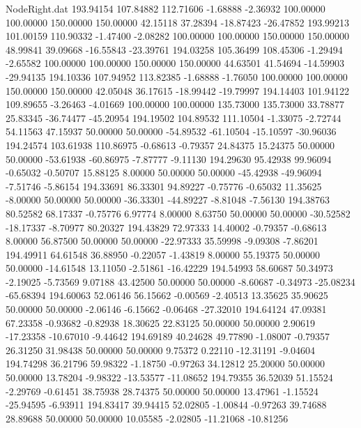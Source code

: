 \begin{filecontents}{NodeRight.dat}
 193.94154  107.84882  112.71606    -1.68888   -2.36932  100.00000  100.00000  150.00000  150.00000   42.15118   37.28394  -18.87423  -26.47852
 193.99213  101.00159  110.90332    -1.47400   -2.08282  100.00000  100.00000  150.00000  150.00000   48.99841   39.09668  -16.55843  -23.39761
 194.03258  105.36499  108.45306    -1.29494   -2.65582  100.00000  100.00000  150.00000  150.00000   44.63501   41.54694  -14.59903  -29.94135
 194.10336  107.94952  113.82385    -1.68888   -1.76050  100.00000  100.00000  150.00000  150.00000   42.05048   36.17615  -18.99442  -19.79997
 194.14403  101.94122  109.89655    -3.26463   -4.01669  100.00000  100.00000  135.73000  135.73000   33.78877   25.83345  -36.74477  -45.20954
 194.19502  104.89532  111.10504    -1.33075   -2.72744   54.11563   47.15937   50.00000   50.00000  -54.89532  -61.10504  -15.10597  -30.96036
 194.24574  103.61938  110.86975    -0.68613   -0.79357   24.84375   15.24375   50.00000   50.00000  -53.61938  -60.86975   -7.87777   -9.11130
 194.29630   95.42938   99.96094    -0.65032   -0.50707   15.88125    8.00000   50.00000   50.00000  -45.42938  -49.96094   -7.51746   -5.86154
 194.33691   86.33301   94.89227    -0.75776   -0.65032   11.35625   -8.00000   50.00000   50.00000  -36.33301  -44.89227   -8.81048   -7.56130
 194.38763   80.52582   68.17337    -0.75776    6.97774    8.00000    8.63750   50.00000   50.00000  -30.52582  -18.17337   -8.70977   80.20327
 194.43829   72.97333   14.40002    -0.79357   -0.68613    8.00000   56.87500   50.00000   50.00000  -22.97333   35.59998   -9.09308   -7.86201
 194.49911   64.61548   36.88950    -0.22057   -1.43819    8.00000   55.19375   50.00000   50.00000  -14.61548   13.11050   -2.51861  -16.42229
 194.54993   58.60687   50.34973    -2.19025   -5.73569    9.07188   43.42500   50.00000   50.00000   -8.60687   -0.34973  -25.08234  -65.68394
 194.60063   52.06146   56.15662    -0.00569   -2.40513   13.35625   35.90625   50.00000   50.00000   -2.06146   -6.15662   -0.06468  -27.32010
 194.64124   47.09381   67.23358    -0.93682   -0.82938   18.30625   22.83125   50.00000   50.00000    2.90619  -17.23358  -10.67010   -9.44642
 194.69189   40.24628   49.77890    -1.08007   -0.79357   26.31250   31.98438   50.00000   50.00000    9.75372    0.22110  -12.31191   -9.04604
 194.74298   36.21796   59.98322    -1.18750   -0.97263   34.12812   25.20000   50.00000   50.00000   13.78204   -9.98322  -13.53577  -11.08652
 194.79355   36.52039   51.15524    -2.29769   -0.61451   38.75938   28.74375   50.00000   50.00000   13.47961   -1.15524  -25.94595   -6.93911
 194.83417   39.94415   52.02805    -1.00844   -0.97263   39.74688   28.89688   50.00000   50.00000   10.05585   -2.02805  -11.21068  -10.81256

\end{filecontents}
